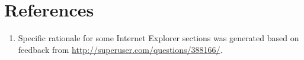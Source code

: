 \section{References}
\begin{enumerate}
    \item Specific rationale for some Internet Explorer sections was generated
    based on feedback from \url{http://superuser.com/questions/388166/}.
\end{enumerate}

